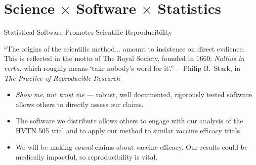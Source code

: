 \documentclass{beamer}
\begin{document}

\section{Science $\times$ Software $\times$ Statistics}


\begin{frame}[c]{Statistical Software Promotes Scientific Reproducibility}

\begin{center}

\begin{tcolorbox}
  ``The origins of the scientific method$\ldots$ amount to insistence on
  direct evdience. This is reflected in the motto of The Royal Society, founded
  in 1660: \textit{Nullius in verba}, which roughly means `take nobody's word
  for it'.'' ---Philip B.~Stark, in \textit{The Practice of Reproducible
  Research}
\end{tcolorbox}

\begin{itemize}
  \itemsep4pt
  \item \textit{Show me}, not \textit{trust me} --- robust, well documented,
    rigorously tested software allows others to directly assess our claims.
  \item The software we distribute allows others to engage with our analysis of
    the HVTN 505 trial and to apply our method to similar vaccine efficacy
    trials.
  \item We will be making \textit{causal} claims about vaccine efficacy. Our
    results could be medically impactful, so reproducibility is vital.
\end{itemize}
\end{center}

\note{
}

\end{frame}

\end{document}
